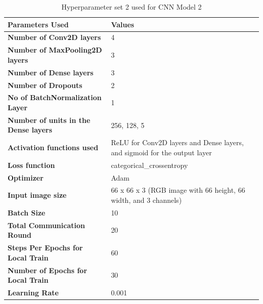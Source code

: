 \begin{table}[!ht]
\caption{Hyperparameter set 2 used for CNN Model 2}
\centering
\begin{tabular}{p{6cm}p{6cm}}
\hline
\small \textbf{Parameters Used} & \small \textbf{Values}  \\
\hline
\small \textbf{Number of Conv2D layers} & \small 4 \\ 

\small \textbf{Number of MaxPooling2D layers} & \small 3  \\

\small \textbf{Number of Dense layers} & \small 3 \\

\small \textbf{Number of Dropouts} & \small 2 \\

\small \textbf{No of BatchNormalization Layer} & \small 1 \\

\small \textbf{Number of units in the Dense layers} & \small 256, 128, 5 \\

\small \textbf{Activation functions used} & \small ReLU for Conv2D layers and Dense layers, and sigmoid for the output layer \\ 

\small \textbf{Loss function} & \small categorical_crossentropy \\ 

\small \textbf{Optimizer} & \small Adam \\ 

\small \textbf{Input image size} & \small 66 x 66 x 3 (RGB image with 66 height, 66 width, and 3 channels) \\ 

\small \textbf{Batch Size} & \small 10 \\ 

\small \textbf{Total Communication Round} & \small 20 \\

\small \textbf{Steps Per Epochs for Local Train} & \small 60 \\ 

\small \textbf{Number of Epochs for Local Train} & \small 30 \\ 

\small \textbf{Learning Rate} & \small 0.001 \\ 
\hline
\end{tabular}
\label{table:hyperparameters}
\end{table}



